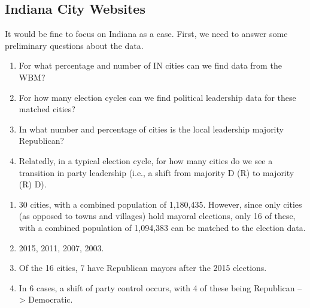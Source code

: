 \documentclass[11pt]{article}
\begin{document}
\subsection{Indiana City Websites}

It would be fine to focus on Indiana as a case. First, we need to answer some preliminary questions about the data.

\begin{enumerate}

\item For what percentage and number of IN cities can we find data from the WBM?
\item For how many election cycles can we find political leadership data for these matched cities?
\item In what number and percentage of cities is the local leadership majority Republican? 
\item Relatedly, in a typical election cycle, for how many cities do we see a transition in party leadership (i.e., a shift from majority D (R) to majority (R) D). 

\end{enumerate}

\begin{enumerate}
	
	\item 30 cities, with a combined population of 1,180,435. However, since only cities (as opposed to towns and villages) hold mayoral elections, only 16 of these, with a combined population of 1,094,383 can be matched to the election data.
	\item 2015, 2011, 2007, 2003.
	\item Of the 16 cities, 7 have Republican mayors after the 2015 elections.
	\item In 6 cases, a shift of party control occurs, with 4 of these being Republican --> Democratic. 
	
\end{enumerate}
\end{document}

